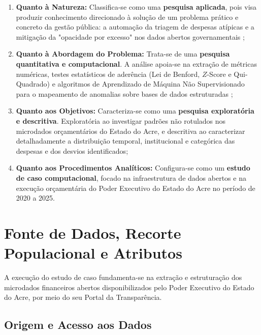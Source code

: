 \documentclass[
    12pt,               %
    openright,          %
    oneside,            %
    a4paper,            %
    chapter=TITLE,      %
    sumario=tradicional,%
    english,            %
    brazilian,          %
 ]{abntex2}
\begin{document}
\begin{enumerate}
    \item \textbf{Quanto à Natureza:} Classifica-se como uma \textbf{pesquisa aplicada}, pois visa produzir conhecimento direcionado à solução de um problema prático e concreto da gestão pública: a automação da triagem de despesas atípicas e a mitigação da "opacidade por excesso" nos dados abertos governamentais \cite{cavalcanti2014, pereira2025};

    \item \textbf{Quanto à Abordagem do Problema:} Trata-se de uma \textbf{pesquisa quantitativa e computacional}. A análise apoia-se na extração de métricas numéricas, testes estatísticos de aderência (Lei de Benford, $Z$-Score e Qui-Quadrado) e algoritmos de Aprendizado de Máquina Não Supervisionado para o mapeamento de anomalias sobre bases de dados estruturadas \cite{goldschmidt2005, nunes2021};

    \item \textbf{Quanto aos Objetivos:} Caracteriza-se como uma \textbf{pesquisa exploratória e descritiva}. Exploratória ao investigar padrões não rotulados nos microdados orçamentários do Estado do Acre, e descritiva ao caracterizar detalhadamente a distribuição temporal, institucional e categórica das despesas e dos desvios identificados;

    \item \textbf{Quanto aos Procedimentos Analíticos:} Configura-se como um \textbf{estudo de caso computacional}, focado na infraestrutura de dados abertos e na execução orçamentária do Poder Executivo do Estado do Acre no período de 2020 a 2025.
\end{enumerate}

\section{Fonte de Dados, Recorte Populacional e Atributos}\label{sec:fonte_dados_atributos}

A execução do estudo de caso fundamenta-se na extração e estruturação dos microdados financeiros abertos disponibilizados pelo Poder Executivo do Estado do Acre, por meio do seu Portal da Transparência.

\subsection{Origem e Acesso aos Dados}\label{subsec:origem_dados}
\end{document}
